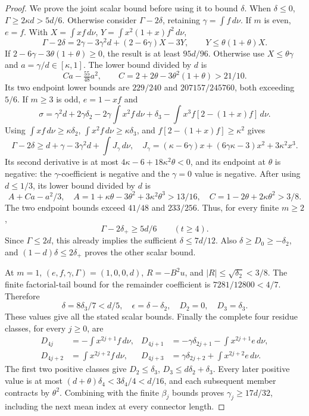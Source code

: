 \begin{proof}
We prove the joint scalar bound before using it to bound \(\delta\).
When \(\delta\le0\), \(\Gamma\ge2\kappa d>5d/6\).
Otherwise consider \(\Gamma-2\delta\), retaining
\(\gamma=\int f\,d\nu\). If \(m\) is even, \(e=f\). With
\(X=\int xf\,d\nu\), \(Y=\int x^2(1+x)f^2\,d\nu\),
\[
 \Gamma-2\delta=2\gamma-3\gamma^2d+(2-6\gamma)X-3Y,
 \qquad Y\le\theta(1+\theta)X.
\]
If \(2-6\gamma-3\theta(1+\theta)\ge0\), the result is at
least \(95d/96\). Otherwise use \(X\le\theta\gamma\) and
\(a=\gamma/d\in[\kappa,1]\). The lower bound divided by \(d\) is
\[
 C a-\tfrac{55}{48}a^2,\qquad
 C=2+2\theta-3\theta^2(1+\theta)>21/10.
\]
Its two endpoint lower bounds are \(229/240\) and
\(207157/245760\), both exceeding \(5/6\).
If \(m\ge3\) is odd, \(e=1-xf\) and
\[
 \sigma=\gamma^2d+2\gamma\delta_2-2\gamma\int x^2f\,d\nu
 +\delta_3-\int x^3 f[2-(1+x)f]\,d\nu.
\]
Using \(\int xf\,d\nu\ge\kappa\delta_2\),
\(\int x^2f\,d\nu\ge\kappa\delta_3\), and
\(f[2-(1+x)f]\ge\kappa^2\) gives
\[
 \Gamma-2\delta\ge d+\gamma-3\gamma^2d+\int J_\gamma\,d\nu,
 \quad J_\gamma=(\kappa-6\gamma)x+(6\gamma\kappa-3)x^2
                         +3\kappa^2x^3.
\]
Its second derivative is at most
\(4\kappa-6+18\kappa^2\theta<0\), and its endpoint at
\(\theta\) is negative: the \(\gamma\)-coefficient is negative
and the \(\gamma=0\) value is negative. After using \(d\le1/3\), its lower bound divided
by \(d\) is
\[
 A+Ca-a^2/3,\quad
 A=1+\kappa\theta-3\theta^2+3\kappa^2\theta^3>13/16,
 \quad C=1-2\theta+2\kappa\theta^2>3/8.
\]
The two endpoint bounds exceed \(41/48\) and \(233/256\).
Thus, for every finite \(m\ge2\),
\begin{equation}\label{eq:odd-two:joint-loss}
 \Gamma-2\delta_+\ge5d/6\qquad(t\ge4).
\end{equation}
Since \(\Gamma\le2d\), this already implies the sufficient
\(\delta\le7d/12\). Also \(\delta\ge D_0\ge-\delta_2\),
and \((1-d)\delta\le2\delta_+\) proves the other scalar bound.

At \(m=1\), \((e,f,\gamma,\Gamma)=(1,0,0,d)\),
\(R=-B^2u\), and \(|R|\le\sqrt{\delta_2}<3/8\).
The finite factorial-tail bound for the remainder coefficient is
\(7281/12800<4/7\). Therefore
\[
 \delta=8\delta_3/7<d/5,\quad
 \epsilon=\delta-\delta_2,\quad D_2=0,\quad D_3=\delta_3.
\]
These values give all the stated scalar bounds.
Finally the complete four residue classes, for every \(j\ge0\), are
\[
\begin{aligned}
 D_{4j}&=-\int x^{2j+1}f\,d\nu,&
 D_{4j+1}&=-\gamma\delta_{2j+1}-\int x^{2j+1}e\,d\nu,\\
 D_{4j+2}&=\int x^{2j+2}f\,d\nu,&
 D_{4j+3}&=\gamma\delta_{2j+2}+\int x^{2j+2}e\,d\nu.
\end{aligned}
\]
The first two positive classes give
\(D_2\le\delta_3\), \(D_3\le d\delta_2+\delta_3\).
Every later positive value is at most
\((d+\theta)\delta_4<3\delta_4/4<d/16\), and each
subsequent member contracts by \(\theta^2\). Combining with the
finite \(\beta_j\) bounds proves \(\gamma_j\ge17d/32\), including
the next mean index at every connector length.
\end{proof}

